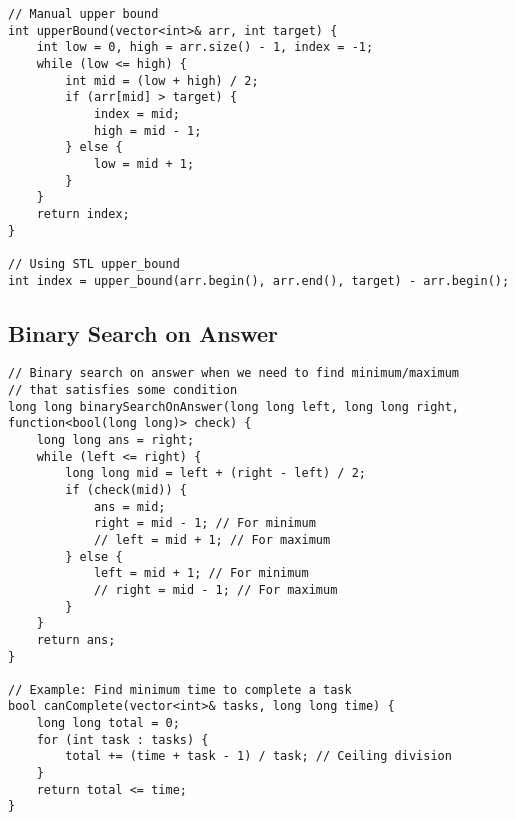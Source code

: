 \documentclass[11pt,a4paper]{article}
\begin{document}
\newpage

\begin{lstlisting}[caption={Upper Bound Implementation}]
// Manual upper bound
int upperBound(vector<int>& arr, int target) {
    int low = 0, high = arr.size() - 1, index = -1;
    while (low <= high) {
        int mid = (low + high) / 2;
        if (arr[mid] > target) {
            index = mid;
            high = mid - 1;
        } else {
            low = mid + 1;
        }
    }
    return index;
}

// Using STL upper_bound
int index = upper_bound(arr.begin(), arr.end(), target) - arr.begin();
\end{lstlisting}

\newpage

\subsection{Binary Search on Answer}
\begin{lstlisting}
// Binary search on answer when we need to find minimum/maximum
// that satisfies some condition
long long binarySearchOnAnswer(long long left, long long right, function<bool(long long)> check) {
    long long ans = right;
    while (left <= right) {
        long long mid = left + (right - left) / 2;
        if (check(mid)) {
            ans = mid;
            right = mid - 1; // For minimum
            // left = mid + 1; // For maximum
        } else {
            left = mid + 1; // For minimum
            // right = mid - 1; // For maximum
        }
    }
    return ans;
}

// Example: Find minimum time to complete a task
bool canComplete(vector<int>& tasks, long long time) {
    long long total = 0;
    for (int task : tasks) {
        total += (time + task - 1) / task; // Ceiling division
    }
    return total <= time;
}
\end{lstlisting}

\newpage
        
\end{document}
